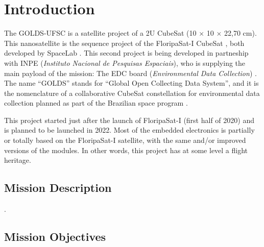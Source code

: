 %
%
%
%
%

%
%
%
%
%
%

\chapter{Introduction} \label{ch:introduction}

The GOLDS-UFSC is a satellite project of a 2U CubeSat (10 $\times$ 10 $\times$ 22,70 cm). This nanosatellite is the sequence project of the FloripaSat-I CubeSat \cite{floripasat}, both developed by SpaceLab \cite{spacelab}. This second project is being developed in partneship with INPE (\textit{Instituto Nacional de Pesquisas Espaciais}), who is supplying the main payload of the mission: The EDC board (\textit{Environmental Data Collection}) \cite{edc}. The name ``GOLDS'' stands for ``Global Open Collecting Data System'', and it is the nomenclature of a collaborative CubeSat constellation for environmental data collection planned as part of the Brazilian space program \cite{golds}.

This project started just after the launch of FloripaSat-I (first half of 2020) and is planned to be launched in 2022. Most of the embedded electronics is partially or totally based on the FloripaSat-I satellite, with the same and/or improved versions of the modules. In other words, this project has at some level a flight heritage.

\section{Mission Description}

.

\section{Mission Objectives}

